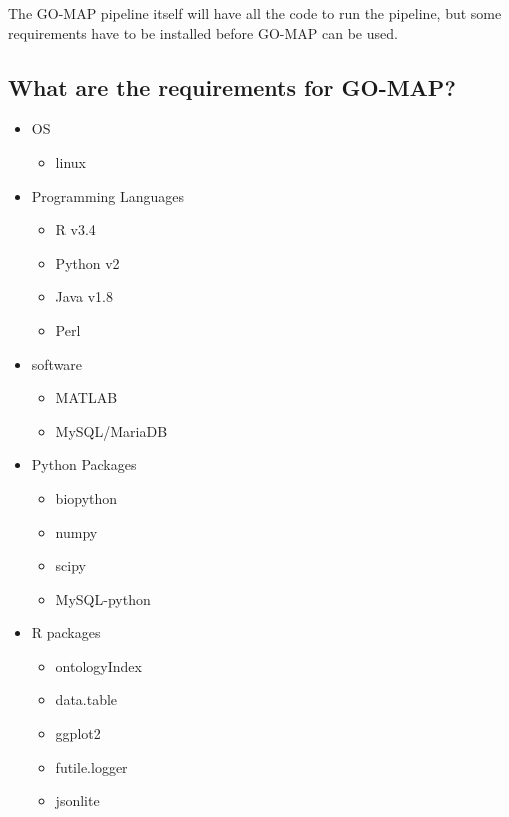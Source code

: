 The GO-MAP pipeline itself will have all the code to run the pipeline, but some requirements have to be installed before GO-MAP can be used. \\[0.3cm]

\subsection{What are the requirements for GO-MAP?}

\begin{itemize}
 \item OS
 \begin{itemize}
     \item linux
 \end{itemize}


 \item Programming Languages
 \begin{itemize}
   \item R v3.4
   \item Python v2
   \item Java v1.8
   \item Perl
 \end{itemize}

 \item software
 \begin{itemize}
   \item MATLAB
   \item MySQL/MariaDB
 \end{itemize}

 \item Python Packages
 \begin{itemize}
  \item biopython
  \item numpy
  \item scipy
  \item MySQL-python
 \end{itemize}

 \item R packages
 \begin{itemize}
  \item ontologyIndex
  \item data.table
  \item ggplot2
  \item futile.logger
  \item jsonlite
 \end{itemize}

\end{itemize}

